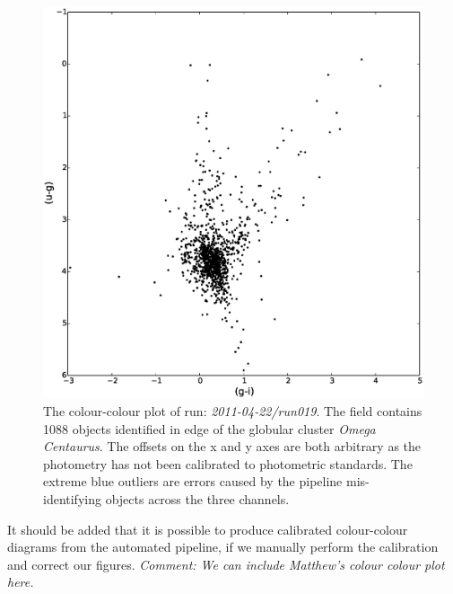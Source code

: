 \begin{figure}[!h]
\centering
\includegraphics[width=120mm]{images//2011-04-22-run019-omegacen-2colour.eps}
\caption{The colour-colour plot of run: \emph{2011-04-22/run019}. The field contains 1088 objects identified in edge of the globular cluster \emph{Omega Centaurus}. The offsets on the x and y axes are both arbitrary as the photometry has not been calibrated to photometric standards. The extreme blue outliers are errors caused by the pipeline mis-identifying objects across the three channels.}
\label{fig:differentialtrad}
\end{figure}

It should be added that it is possible to produce calibrated colour-colour diagrams from the automated pipeline, if we manually perform the calibration and correct our figures. \emph{Comment: We can include Matthew's colour colour plot here.} 
